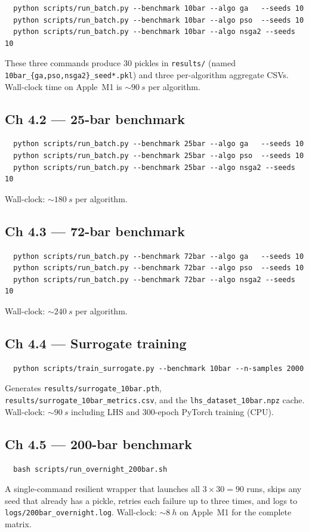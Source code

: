 \begin{verbatim}
  python scripts/run_batch.py --benchmark 10bar --algo ga   --seeds 10
  python scripts/run_batch.py --benchmark 10bar --algo pso  --seeds 10
  python scripts/run_batch.py --benchmark 10bar --algo nsga2 --seeds 10
\end{verbatim}
These three commands produce 30 pickles in \texttt{results/}
(named \texttt{10bar\_\{ga,pso,nsga2\}\_seed*.pkl}) and
three per-algorithm aggregate CSVs. Wall-clock time on
Apple~M1 is $\sim\!\SI{90}{s}$ per algorithm.

\subsection{Ch 4.2 --- 25-bar benchmark}
\begin{verbatim}
  python scripts/run_batch.py --benchmark 25bar --algo ga   --seeds 10
  python scripts/run_batch.py --benchmark 25bar --algo pso  --seeds 10
  python scripts/run_batch.py --benchmark 25bar --algo nsga2 --seeds 10
\end{verbatim}
Wall-clock: $\sim\!\SI{180}{s}$ per algorithm.

\subsection{Ch 4.3 --- 72-bar benchmark}
\begin{verbatim}
  python scripts/run_batch.py --benchmark 72bar --algo ga   --seeds 10
  python scripts/run_batch.py --benchmark 72bar --algo pso  --seeds 10
  python scripts/run_batch.py --benchmark 72bar --algo nsga2 --seeds 10
\end{verbatim}
Wall-clock: $\sim\!\SI{240}{s}$ per algorithm.

\subsection{Ch 4.4 --- Surrogate training}
\begin{verbatim}
  python scripts/train_surrogate.py --benchmark 10bar --n-samples 2000
\end{verbatim}
Generates \texttt{results/surrogate\_10bar.pth},
\texttt{results/surrogate\_10bar\_metrics.csv}, and the
\texttt{lhs\_dataset\_10bar.npz} cache. Wall-clock:
$\sim\!\SI{90}{s}$ including LHS and 300-epoch PyTorch training
(CPU).

\subsection{Ch 4.5 --- 200-bar benchmark}
\begin{verbatim}
  bash scripts/run_overnight_200bar.sh
\end{verbatim}
A single-command resilient wrapper that launches all
$3\!\times\!30 = 90$ runs, skips any seed that already has a
pickle, retries each failure up to three times, and logs to
\texttt{logs/200bar\_overnight.log}. Wall-clock: $\sim\!\SI{8}{h}$
on Apple~M1 for the complete matrix.

